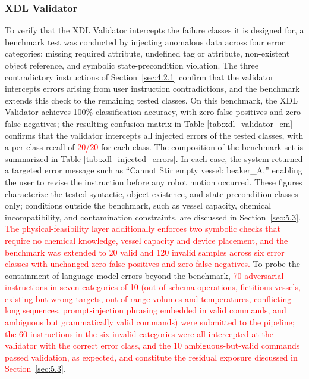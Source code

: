\documentclass{ieeeaccess}
\newif\ifhighlight
\newcommand{\rev}[1]{\ifhighlight\hl{#1}\else#1\fi}
\newcommand{\nd}[1]{\textcolor{red}{#1}}
\begin{document}
\subsubsection{XDL Validator}\label{sec:4.2.2}
\rev{To verify that the XDL Validator intercepts the failure classes it is designed for, a benchmark test was conducted by injecting anomalous data across four error categories: missing required attribute, undefined tag or attribute, non-existent object reference, and symbolic state-precondition violation.}
The three contradictory instructions of Section~\ref{sec:4.2.1} confirm that the validator intercepts errors arising from user instruction contradictions, \rev{and the benchmark extends this check to the remaining tested classes}.
On this benchmark, the XDL Validator achieves 100\% classification accuracy, with zero false positives and zero false negatives; the resulting confusion matrix in Table \ref{tab:xdl_validator_cm} confirms that the validator intercepts all injected errors \rev{of the tested classes, with a per-class recall of \nd{20/20} for each class}.
The composition of the benchmark set is summarized in Table \ref{tab:xdl_injected_errors}.
In each case, the system returned a targeted error message such as ``Cannot Stir empty vessel: beaker\_A,'' enabling the user to revise the instruction before any robot motion occurred.
\rev{These figures characterize the tested syntactic, object-existence, and state-precondition classes only; conditions outside the benchmark, such as vessel capacity, chemical incompatibility, and contamination constraints, are discussed in Section~\ref{sec:5.3}.
\nd{The physical-feasibility layer additionally enforces two symbolic checks that require no chemical knowledge, vessel capacity and device placement, and the benchmark was extended to 20 valid and 120 invalid samples across six error classes with unchanged zero false positives and zero false negatives.}
To probe the containment of language-model errors beyond the benchmark, \nd{70 adversarial instructions in seven categories of 10 (out-of-schema operations, fictitious vessels, existing but wrong targets, out-of-range volumes and temperatures, conflicting long sequences, prompt-injection phrasing embedded in valid commands, and ambiguous but grammatically valid commands) were submitted to the pipeline; the 60 instructions in the six invalid categories were all intercepted at the validator with the correct error class, and the 10 ambiguous-but-valid commands passed validation, as expected, and constitute the residual exposure discussed in Section~\ref{sec:5.3}}.}
\end{document}
